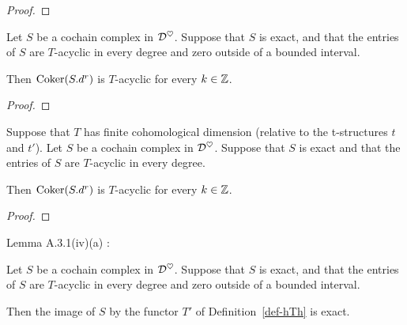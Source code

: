 \begin{proof}
\leanok
\end{proof}


\begin{lemma}
\label{prop-acyclic_coker_of_bounded_exact_acyclic_complex}
\leanok 
{}
Let $S$ be a cochain complex in $\mathcal{D}^\heartsuit$.
Suppose that $S$ is exact, and that
the entries of $S$ are $T$-acyclic in every degree and zero outside of a bounded interval.

Then $\operatorname{Coker} (S.d^r)$ is $T$-acyclic for every $k\in\mathbb{Z}$.

\end{lemma}

\begin{proof}
\leanok
\end{proof}


\begin{lemma}
\label{prop-acyclic_coker_of_exact_acyclic_complex_and_bounded_functor}
\leanok 
{}
Suppose that $T$ has finite cohomological dimension (relative to the t-structures $t$ and $t'$).
Let $S$ be a cochain complex in $\mathcal{D}^\heartsuit$.
Suppose that $S$ is exact  and that
the entries of $S$ are $T$-acyclic in every degree.

Then $\operatorname{Coker} (S.d^r)$ is $T$-acyclic for every $k\in\mathbb{Z}$.

\end{lemma}

\begin{proof}
\leanok
\end{proof}


Lemma A.3.1(iv)(a) :

\begin{lemma}
\label{prop-exact_map_of_exact_bounded_acyclic_complex}
\leanok 
{}
Let $S$ be a cochain complex in $\mathcal{D}^\heartsuit$.
Suppose that $S$ is exact, and that
the entries of $S$ are $T$-acyclic in every degree and zero outside of a bounded interval.

Then the image of $S$ by the functor $T'$ of Definition~\ref{def-hTh} is exact.

\end{lemma}


